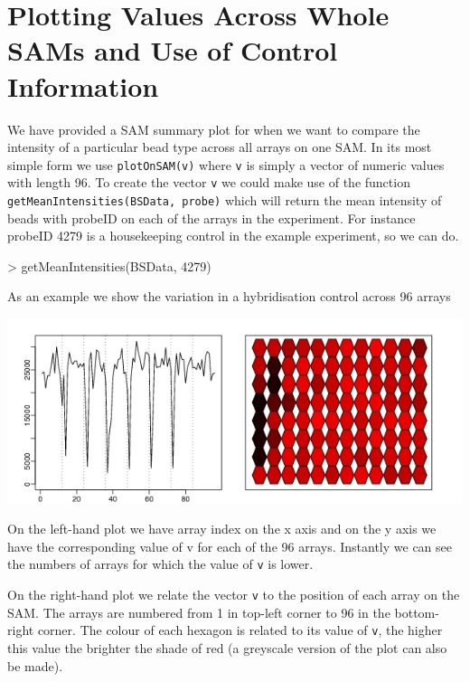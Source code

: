 \documentclass[a4paper]{article}
\newcommand{\Robject}[1]{{\texttt{#1}}}
\newcommand{\Rfunction}[1]{{\texttt{#1}}}
\begin{document}
\section{Plotting Values Across Whole SAMs and Use of Control Information}
\label{plotting_across_arrays}

We have provided a SAM summary plot for when we want to compare the intensity of a particular bead type across all arrays on one SAM. In its most simple form we use \Rfunction{plotOnSAM(v)} where \Robject{v}
is simply a vector of numeric values with length 96. To create the vector \Robject{v} we could make use of the function \Rfunction{getMeanIntensities(BSData, probe)} which will return the mean intensity of beads with probeID on each of the
arrays in the experiment. For instance probeID 4279 is a housekeeping control in the example experiment, so we can do.

\begin{Schunk}
\begin{Sinput}
> getMeanIntensities(BSData, 4279)
\end{Sinput}
\end{Schunk}

As an example we show the variation in a hybridisation control across 96 arrays

\includegraphics{testpdf2.jpg}

On the left-hand plot we have array index on the x axis and on the y axis we have the corresponding value of v for each of the 96 arrays. Instantly we can see the numbers of arrays for which the value of \Robject{v} is lower.

On the right-hand plot we relate the vector \Robject{v} to the position of each array on the SAM. The arrays are numbered from 1 in top-left corner to 96 in the bottom-right corner. The colour of each hexagon is related to its value of \Robject{v}, the higher this value the brighter the shade of red (a greyscale version of the plot can also be made). 
\end{document}
